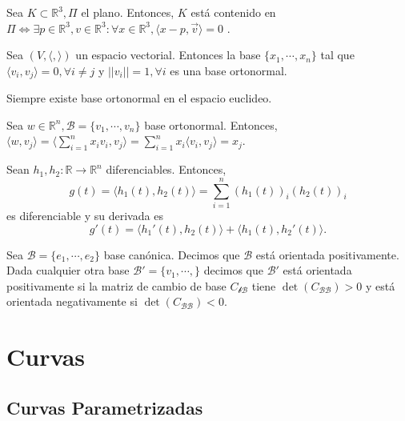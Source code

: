 \begin{prop}
  Sea $K \subset \mathbb{R}^{3}, \Pi$ el plano. Entonces, $K$ está contenido en $\Pi \Leftrightarrow \exists p \in \mathbb{R}^{3}, v \in \mathbb{R}^{3}: \forall x \in \mathbb{R}^{3},\langle x-p{ , }\vec{v} \rangle = 0$ .
\end{prop}

\begin{defn}
  Sea $(V, \langle { , } \rangle)$ un espacio vectorial. Entonces la base $\{ x_{1}, \cdots, x_{n} \}$ tal que $\langle v_{i}{ , }v_{j} \rangle = 0, \forall i \neq j$ y $||v_{i}|| = 1, \forall i$ es una base ortonormal.
\end{defn}

\begin{obs}
  Siempre existe base ortonormal en el espacio euclideo.
\end{obs}

\begin{obs}
  Sea $w \in \mathbb{R}^{n}, \mathcal{B} = \{ v_{1}, \cdots, v_{n} \}$ base ortonormal. Entonces, $\langle w{ , }v_{j} \rangle = \langle \sum_{i=1}^{n} x_{i} v_{i}{ , }v_{j} \rangle = \sum_{i=1}^{n}x_{i}  \langle v_{i}{ , }v_{j} \rangle = x_{j}$.
\end{obs}

\begin{obs}
  Sean $h_{1}, h_{2}: \mathbb{R} \to \mathbb{R}^{n}$ diferenciables. Entonces,
  \[
    g(t) = \langle h_{1}(t){ , }h_{2}(t) \rangle = \sum_{i=1}^{n} (h_{1}(t))_{i} (h_{2}(t))_{i}
  \]
  es diferenciable y su derivada es
  \[ 
    g'(t) = \langle h_{1}'(t){ , }h_{2}(t) \rangle + \langle h_{1}(t){ , }h_{2}'(t) \rangle.
  \] 
\end{obs}

\begin{defn}[Orientación]
  Sea $\mathcal{B} = \{ e_{1}, \cdots, e_{2} \}$ base canónica. Decimos que $\mathcal{B}$ está orientada positivamente. Dada cualquier otra base $ \mathcal{B}' = \{ v_{1}, \cdots,  \}$ decimos que $\mathcal{B}'$ está orientada positivamente si la matriz de cambio de base $C_{\mathcal{b} \mathcal{B}}$ tiene $ \det(C_{\mathcal{B} \mathcal{B}}) > 0$ y está orientada negativamente si $\det(C_{\mathcal{B} \mathcal{B}}) < 0$.
\end{defn}
 
\chapter{Curvas}
\section{Curvas Parametrizadas}

